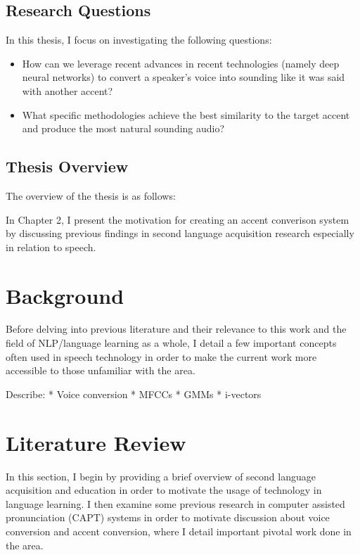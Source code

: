 \documentclass
[
    a4paper,
    twoside,
    12pt
]
{report}
\begin{document}
\section{Research Questions}\label{research-questions}

In this thesis, I focus on investigating the following questions:

\begin{itemize}
\item
  How can we leverage recent advances in recent technologies (namely
  deep neural networks) to convert a speaker's voice into sounding like
  it was said with another accent?
\item
  What specific methodologies achieve the best similarity to the target
  accent and produce the most natural sounding audio?
\end{itemize}

\section{Thesis Overview}\label{thesis-overview}

The overview of the thesis is as follows:

In Chapter 2, I present the motivation for creating an accent converison
system by discussing previous findings in second language acquisition
research especially in relation to speech.
\cleardoublepage

\chapter{Background}

Before delving into previous literature and their relevance to this work
and the field of NLP/language learning as a whole, I detail a few
important concepts often used in speech technology in order to make the
current work more accessible to those unfamiliar with the area.

Describe: * Voice conversion * MFCCs * GMMs * i-vectors
\chapter{Literature Review}

In this section, I begin by providing a brief overview of second
language acquisition and education in order to motivate the usage of
technology in language learning. I then examine some previous research
in computer assisted pronunciation (CAPT) systems in order to motivate
discussion about voice conversion and accent conversion, where I detail
important pivotal work done in the area.
\end{document}
